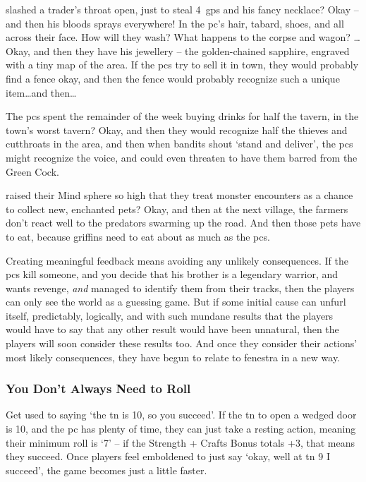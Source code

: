 \begin{multicols}{2}
 slashed a trader's throat open, just to steal 4~\glspl{gp} and his fancy necklace?
Okay -- and then his bloods sprays everywhere!
In the \gls{pc}'s hair, tabard, shoes, and all across their face.
How will they wash?
What happens to the corpse and wagon?
\ldots Okay, and then they have his jewellery -- the golden-chained sapphire, engraved with a tiny map of the area.
If the \glspl{pc} try to sell it in town, they would probably find a fence okay, and then the fence would probably recognize such a unique item\ldots and then\ldots

The \glspl{pc} spent the remainder of the week buying drinks for half the tavern, in the town's worst tavern?
Okay, and then they would recognize half the thieves and cutthroats in the area, and then when bandits shout `stand and deliver', the \glspl{pc} might recognize the voice, and could even threaten to have them barred from the Green Cock.

 raised their Mind \gls{sphere} so high that they treat \gls{monster} encounters as a chance to collect new, enchanted pets?
Okay, and then at the next \gls{village}, the farmers don't react well to the predators swarming up the road.
And then those pets have to eat, because \glspl{griffin} need to eat about as much as the \glspl{pc}.

Creating meaningful feedback means avoiding any unlikely consequences.
If the \glspl{pc} kill someone, and you decide that his brother is a legendary warrior, and wants revenge, \textit{and} managed to identify them from their tracks, then the players can only see the world as a guessing game.
But if some initial cause can unfurl itself, predictably, logically, and with such mundane results that the players would have to say that any other result would have been unnatural, then the players will soon consider these results too.
And once they consider their actions' most likely consequences, they have begun to relate to \gls{fenestra} in a new way.

\subsubsection{You Don't Always Need to Roll}

Get used to saying `the \gls{tn} is 10, so you succeed'.
If the \gls{tn} to open a wedged door is 10, and the \gls{pc} has plenty of time, they can just take a resting action, meaning their minimum roll is `7' -- if the Strength + Crafts Bonus totals +3, that means they succeed.
Once players feel emboldened to just say `okay, well at \gls{tn} 9 I succeed', the game becomes just a little faster.


\end{multicols}
